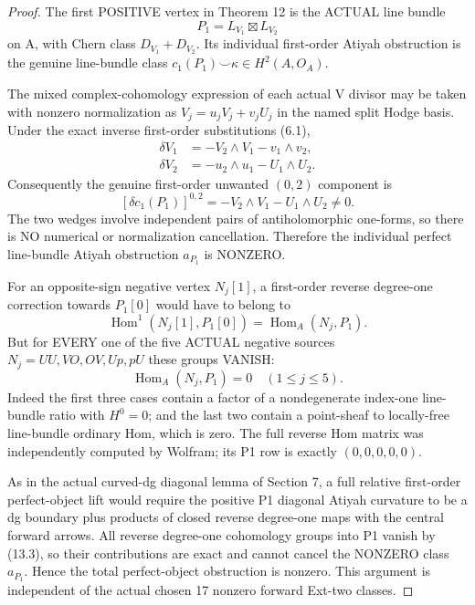 \documentclass[11pt,a4paper]{article}
\begin{document}
\begin{proof}
The first
POSITIVE
vertex in
Theorem 12
is the ACTUAL
line bundle
\[
 P_1=L_{V_1}\boxtimes L_{V_2}
\]
on A, with
Chern class
\(D_{V_1}+D_{V_2}\).
Its individual
first-order
Atiyah
obstruction
is the genuine
line-bundle
class
\(
c_1(P_1)\smile\kappa
\in H^2(A,O_A)
\).

The mixed
complex-cohomology
expression of
each actual
V divisor
may be taken
with nonzero
normalization as
\(
 V_j=u_j V_j+v_j U_j
\)
in the named
split Hodge
basis. Under
the exact
inverse first-order
substitutions
(6.1),
\[
 \begin{aligned}
 \delta V_1&=
    -V_2\wedge V_1
        -v_1\wedge v_2,\\
 \delta V_2&=
    -u_2\wedge u_1
        -U_1\wedge U_2 .
 \end{aligned}
\]
Consequently
the genuine
first-order
unwanted
\((0,2)\)
component is
\[
 \boxed{
 [\delta c_1(P_1)]^{0,2}
   =-V_2\wedge V_1
           -U_1\wedge U_2
       \ne0 .}                                          \tag{13.2}
\]
The two
wedges involve
independent
pairs of
antiholomorphic
one-forms, so
there is NO
numerical or
normalization
cancellation.
Therefore
the individual
perfect
line-bundle
Atiyah
obstruction
\(a_{P_1}\)
is NONZERO.

For an
opposite-sign
negative
vertex \(N_j[1]\),
a first-order
reverse
degree-one
correction
towards
\(P_1[0]\)
would have to
belong to
\[
 \operatorname{Hom}^1
  (N_j[1],P_1[0])
  =\operatorname{Hom}_A(N_j,P_1).
\]
But for
EVERY one of
the five ACTUAL
negative sources
\(N_j=UU,VO,OV,Up,pU\)
these groups
VANISH:
\[
 \boxed{
 \operatorname{Hom}_A(N_j,P_1)=0
               \quad(1\le j\le5).
 }                                                       \tag{13.3}
\]
Indeed the
first three
cases contain
a factor
of a
nondegenerate
index-one
line-bundle
ratio with
\(H^0=0\);
and the
last two
contain
a point-sheaf
to locally-free
line-bundle
ordinary Hom,
which is
zero.
The full
reverse
Hom matrix
was independently
computed by
Wolfram; its
P1 row is
exactly
\((0,0,0,0,0)\).

As in the
actual curved-dg
diagonal lemma
of Section 7,
a full relative
first-order
perfect-object
lift would
require the
positive P1
diagonal
Atiyah
curvature to be
a dg boundary
plus products of
closed reverse
degree-one maps
with the
central
forward
arrows.
All reverse
degree-one
cohomology
groups into P1
vanish by
(13.3), so
their contributions
are exact
and cannot
cancel the
NONZERO
class
\(a_{P_1}\).
Hence the
total perfect-object
obstruction
is nonzero.
This argument
is independent
of the actual
chosen 17
nonzero
forward
Ext-two
classes.
\end{proof}
\end{document}
